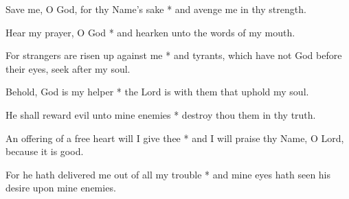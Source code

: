 Save me, O God, for thy Name's sake * and avenge me in thy strength.

Hear my prayer, O God * and hearken unto the words of my mouth.

For strangers are risen up against me * and tyrants, which have not God before their eyes, seek after my soul.

Behold, God is my helper * the Lord is with them that uphold my soul.

He shall reward evil unto mine enemies * destroy thou them in thy truth.

An offering of a free heart will I give thee * and I will praise thy Name, O Lord, because it is good.

For he hath delivered me out of all my trouble * and mine eyes hath seen his desire upon mine enemies.